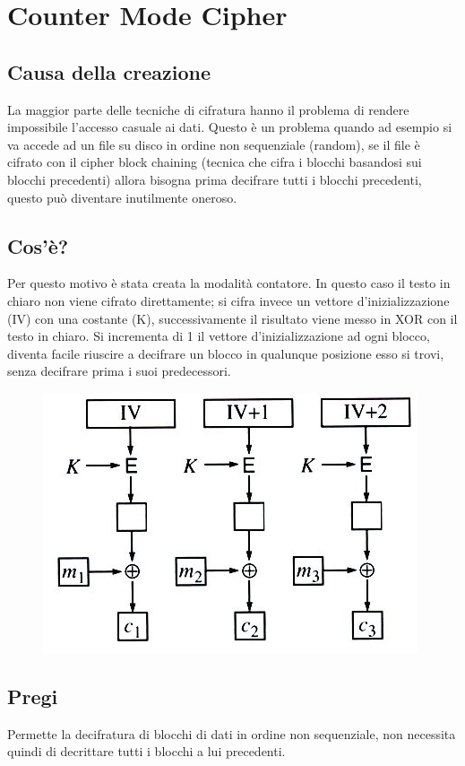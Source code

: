 \section{Counter Mode Cipher}
\subsection{Causa della creazione}
La maggior parte delle tecniche di cifratura hanno il problema di rendere impossibile l’accesso casuale ai dati. Questo è un problema quando ad esempio si va accede ad un file su disco in ordine non sequenziale (random), se il file è cifrato con il cipher block chaining (tecnica che cifra i blocchi basandosi sui blocchi precedenti) allora bisogna prima decifrare tutti i blocchi precedenti, questo può diventare inutilmente oneroso.
\subsection{Cos'è?}
Per questo motivo è stata creata la modalità contatore. In questo caso il testo in chiaro non viene cifrato direttamente; si cifra invece un vettore d’inizializzazione (IV) con una costante (K), successivamente il risultato viene messo in XOR con il testo in chiaro. Si incrementa di 1 il vettore d’inizializzazione ad ogni blocco, diventa facile riuscire a decifrare un blocco in qualunque posizione esso si trovi, senza decifrare prima i suoi predecessori.

\begin{figure}[H]
\centering
\includegraphics[scale=0.6]{res/img/54_CMC.png}
\end{figure}

\subsection{Pregi}
Permette la decifratura di blocchi di dati in ordine non sequenziale, non necessita quindi di decrittare tutti i blocchi a lui precedenti.

